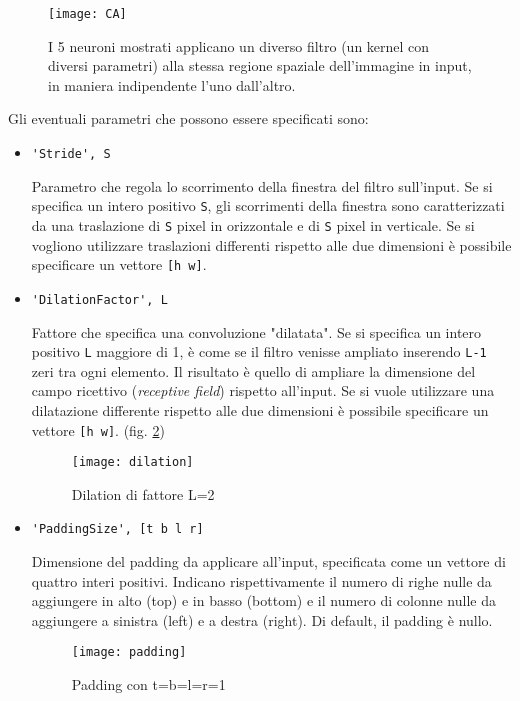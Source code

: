 \begin{figure}[h]
	\centering
	\texttt{[image: CA]}
	\caption[Output di un Convolution Layer]{I 5 neuroni mostrati applicano un diverso filtro (un kernel con diversi parametri) alla stessa regione spaziale dell'immagine in input, in maniera indipendente l'uno dall'altro.}
	\label{fig:ca}
\end{figure}

Gli eventuali parametri che possono essere specificati sono:

\begin{itemize}
	\item \verb|'Stride', S|
	
	Parametro che regola lo scorrimento della finestra del filtro sull'input. Se si specifica un intero positivo \verb|S|, gli scorrimenti della finestra sono caratterizzati da una traslazione di \verb|S| pixel in orizzontale e di \verb|S| pixel in verticale. Se si vogliono utilizzare traslazioni differenti rispetto alle due dimensioni è possibile specificare un vettore \verb|[h w]|.
	
	\item \verb|'DilationFactor', L|
	
	Fattore che specifica una convoluzione "dilatata". Se si specifica un intero positivo \verb|L| maggiore di 1, è come se il filtro venisse ampliato inserendo \verb|L-1| zeri tra ogni elemento. Il risultato è quello di ampliare la dimensione del campo ricettivo (\textit{receptive field}) rispetto all'input. Se si vuole utilizzare una dilatazione differente rispetto alle due dimensioni è possibile specificare un vettore \verb|[h w]|. (fig. \ref{fig:dilation})
	
\begin{figure}[h]
	\centering
	\texttt{[image: dilation]}
	\caption{Dilation di fattore L=2}
	\label{fig:dilation}
\end{figure}
	
	\item \verb|'PaddingSize', [t b l r]|
	
	Dimensione del padding da applicare all'input, specificata come un vettore di quattro interi positivi. Indicano rispettivamente il numero di righe nulle da aggiungere in alto (top) e in basso (bottom) e il numero di colonne nulle da aggiungere a sinistra (left) e a destra (right). Di default, il padding è nullo.
	
	\begin{figure}[h]
	\centering
	\texttt{[image: padding]}
	\caption{Padding con t=b=l=r=1}
	\label{fig:padding}
\end{figure}
	

\end{itemize}
